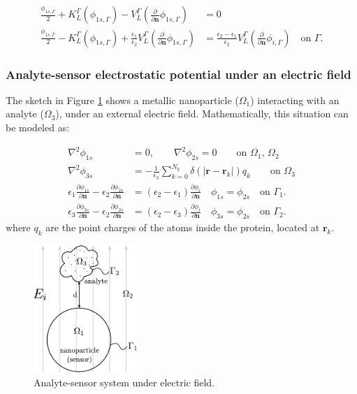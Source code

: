 \begin{align} \label{eq:integral_eq_lspr}
\frac{\phi_{1s,\Gamma}}{2}+ K_{L}^{\Gamma}(\phi_{1s,\Gamma}) - V_{L}^{\Gamma} \left(\frac{\partial}{\partial \mathbf{n}}\phi_{1s,\Gamma} \right) &= 0  \nonumber \\
\frac{\phi_{1s,\Gamma}}{2} - K_{L}^{\Gamma}(\phi_{1s,\Gamma}) + \frac{\epsilon_1}{\epsilon_2}V_{L}^{\Gamma} \left( \frac{\partial}{\partial \mathbf{n}} \phi_{1s,\Gamma}  \right) &=
 \frac{\epsilon_2-\epsilon_1}{\epsilon_2}V_{L}^{\Gamma}\left( \frac{\partial}{\partial \mathbf{n}} \phi_{i,\Gamma} \right)\quad \text{on $\Gamma$.}
\end{align}


\subsubsection{Analyte-sensor electrostatic potential under an electric field}

The sketch in Figure \ref{fig:analyte-sensor} shows a metallic nanoparticle ($\Omega_1$) interacting with an analyte ($\Omega_3$), under an external electric field.
Mathematically, this situation can be modeled as:

\begin{align}\label{eq:electrostatic_scatter_prot_sen}
\nabla^2 \phi_{1s} &= 0, \qquad \nabla^2 \phi_{2s} = 0 \qquad\text{on $\Omega_1$, $\Omega_2$} \nonumber\\
\nabla^2 \phi_{3s} &= -\frac{1}{\epsilon_3} \sum_{k=0}^{N_q} \delta(|\mathbf{r}-\mathbf{r}_k|) q_k \qquad\text{on $\Omega_3$} \nonumber \\
\epsilon_1\frac{\partial\phi_{1s}}{\partial \mathbf{n}} - \epsilon_2\frac{\partial\phi_{2s}}{\partial\mathbf{n}} &= (\epsilon_2-\epsilon_1)\frac{\partial\phi_i}{\partial\mathbf{n}} \quad \phi_{1s} = \phi_{2s} \quad \text{on $\Gamma_1$}. \nonumber\\
\epsilon_3\frac{\partial\phi_{3s}}{\partial \mathbf{n}} - \epsilon_2\frac{\partial\phi_{2s}}{\partial\mathbf{n}} &= (\epsilon_2-\epsilon_3)\frac{\partial\phi_i}{\partial\mathbf{n}} \quad \phi_{3s} = \phi_{2s} \quad \text{on $\Gamma_2$}.
\end{align}
%
where $q_k$ are the point charges of the atoms inside the protein, located at $\mathbf{r}_k$.

\begin{figure}%
   \centering
   \includegraphics[width=0.35\textwidth]{protein_sensor_regions.pdf} 
   \caption{Analyte-sensor system under electric field.}
   \label{fig:analyte-sensor}
\end{figure}

